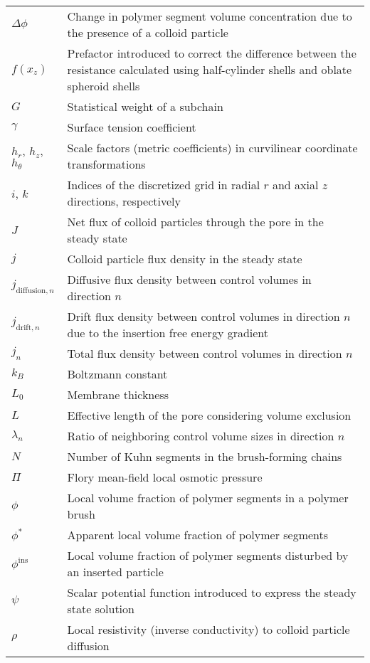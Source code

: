 \documentclass[10pt, a4paper]{article}
\begin{document}
\begin{tabularx}{\linewidth}{l X}
    $\Delta \phi$ & Change in polymer segment volume concentration due to the presence of a colloid particle \\
    $f(x_z)$ & Prefactor introduced to correct the difference between the resistance calculated using half-cylinder shells and oblate spheroid shells \\
    $G$ & Statistical weight of a subchain \\
    $\gamma$ & Surface tension coefficient \\
    $h_{r}$, $h_{z}$, $h_{\theta}$ & Scale factors (metric coefficients) in curvilinear coordinate transformations \\
    $i$, $k$ & Indices of the discretized grid in radial $r$ and axial $z$ directions, respectively \\
    $J$ & Net flux of colloid particles through the pore in the steady state \\
    $j$ & Colloid particle flux density in the steady state \\
    $j_{\text{diffusion}, n}$ & Diffusive flux density between control volumes in direction $n$ \\
    $j_{\text{drift}, n}$ & Drift flux density between control volumes in direction $n$ due to the insertion free energy gradient \\
    $j_{n}$ & Total flux density between control volumes in direction $n$ \\
    $k_B$ & Boltzmann constant \\
    $L_{0}$ & Membrane thickness \\
    $L$ & Effective length of the pore considering volume exclusion \\
    $\lambda_{n}$ & Ratio of neighboring control volume sizes in direction $n$ \\
    $N$ & Number of Kuhn segments in the brush-forming chains \\
    $\Pi$ & Flory mean-field local osmotic pressure \\
    $\phi$ & Local volume fraction of polymer segments in a polymer brush \\
    $\phi^{\ast}$ & Apparent local volume fraction of polymer segments \\
    $\phi^{\text{ins}}$ & Local volume fraction of polymer segments disturbed by an inserted particle \\
    $\psi$ & Scalar potential function introduced to express the steady state solution \\
    $\rho$ & Local resistivity (inverse conductivity) to colloid particle diffusion \\

\end{tabularx}
\end{document}
